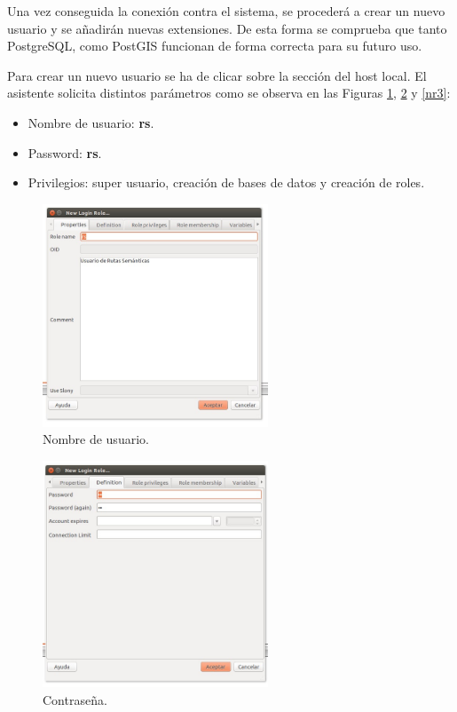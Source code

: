 Una vez conseguida la conexión contra el sistema, se procederá a crear un nuevo usuario y se añadirán nuevas extensiones. De esta forma se comprueba que tanto PostgreSQL, como PostGIS funcionan de forma correcta para su futuro uso.

Para crear un nuevo usuario se ha de clicar sobre la sección  del host local. El asistente solicita distintos parámetros como se observa en las Figuras \ref{nr1}, \ref{nr2} y \ref{nr3}:

\begin{itemize}
	\item Nombre de usuario: \textbf{rs}.
	\item Password: \textbf{rs}.
	\item Privilegios: super usuario, creación de bases de datos y creación de roles.
\end{itemize}

\begin{figure}[h]
  \centering
    \includegraphics[width=0.6\textwidth]{../img/instalacion/nr1.jpg}
  \caption{Nombre de usuario.}
  \label{nr1}
\end{figure}

\begin{figure}[h]
  \centering
    \includegraphics[width=0.6\textwidth]{../img/instalacion/nr2.jpg}
  \caption{Contraseña.}
  \label{nr2}
\end{figure}

